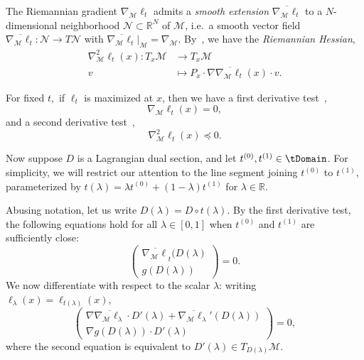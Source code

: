 \documentclass{article}
\numberwithin{equation}{section}
\newcommand{\R}{\mathbb{R}}
\newcommand{\cN}{\mathcal{N}}
\newcommand{\cM}{{\mathcal{M}}}
\newcommand{\demph}[1]{\emph{{\color{RoyalBlue}#1}}}
\begin{document}
The Riemannian gradient $\nabla_\cM \ell_t$ 
admits a \demph{smooth extension} $\overline{\nabla_\cM \ell_t} $ to a $N$-dimensional neighborhood $\cN \subset \R^N$ of $\cM$, i.e.~a smooth vector field $\overline{\nabla_\cM \ell_t}: \cN \to T \cN$ with $\overline{\nabla_\cM \ell_t} |_{\cM} = \nabla_\cM$.
By~\cite[Corollary 5.16]{boumal}, we have the \demph{Riemannian Hessian},
\begin{align}
\nabla_\cM^2 \ell_t (x)  : T_x \cM &\to T_x \cM \nonumber \\
v &\mapsto  P_x \cdot \nabla \overline{\nabla_\cM \ell _t} (x)  \cdot v.
\label{eq:riemannian-hessian}
\end{align}


For fixed $t,$ if $\ell_t$ is maximized at $x$, then we have a first derivative test~\cite[Prop.~4.5]{boumal},
\begin{equation}\label{eq:crit-points-t}
\nabla_\cM \ell_t (x) = 0,
\end{equation}
and a second derivative test~\cite[Prop.~6.3]{boumal},
\begin{equation*}\label{eq:crit-points-t2}
    \nabla_\cM^2 \ell_t (x) \preceq 0.
\end{equation*}

Now suppose $D$ is a Lagrangian dual section, and let $t^{(0)}, t^{(1)} \in \tDomain$. 
For simplicity, we will restrict our attention to the line segment joining $t^{(0)}$ to $t^{(1)}$, parameterized by $t(\lambda) = \lambda t^{(0)} + (1-\lambda)t^{(1)}$ for $\lambda \in \R$.

Abusing notation, let us write $D (\lambda ) = D\circ t (\lambda ).$
By the first derivative test, the following equations hold for all $\lambda \in [0,1]$ when $t^{(0)}$ and $t^{(1)}$ are sufficiently close:
\[
    \begin{pmatrix}
        \overline{\nabla_{\cM} \ell}_t(D(\lambda )\\
        g(D(\lambda ))
    \end{pmatrix} = 0.
\]
We now differentiate with respect to the scalar $\lambda $: writing $\ell_\lambda (x)= \ell_{t(\lambda )} (x),$
\[
    \begin{pmatrix}
        \nabla \overline{\nabla_{\cM} \ell_\lambda } \cdot D'(\lambda ) + \overline{\nabla_{\cM} \ell_\lambda }' (D(\lambda )) \\
        \nabla g  (D(\lambda )) \cdot D '(\lambda )
    \end{pmatrix} = 0,
\]
where the second equation is equivalent to $D'(\lambda ) \in T_{D(\lambda )} \cM.$
\end{document}
